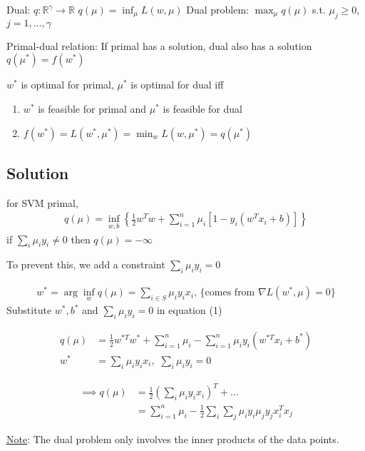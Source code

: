 \documentclass[11pt]{article}
\begin{document}
Dual: \(q: \mathbb{R}^{\gamma} \rightarrow \mathbb{R}\)
\(q(\mu) = \inf_{\mu} L(w, \mu)\)
Dual problem: \(\max_{\mu} q(\mu)\) s.t. \(\mu_j \geq 0\), \(j = 1, ..., \gamma\)

Primal-dual relation: If primal has a solution, dual also has a solution
\(q(\mu^{*}) = f(w^{*})\)

\(w^{*}\) is optimal for primal, \(\mu^{*}\) is optimal for dual iff
\begin{enumerate}
\item \(w^{*}\) is feasible for primal and \(\mu^{*}\) is feasible for dual
\item \(f(w^{*}) = L(w^{*}, \mu^{*}) = \min_w L(w, \mu^{*}) = q(\mu^{*})\)
\end{enumerate}

\subsection{Solution}
\label{sec:orgba442ce}
for SVM primal,
\begin{align}
q(\mu) = \inf_{w, b} \left\{ \frac{1}{2}w^Tw + \sum_{i=1}^n \mu_i \left[ 1 - y_i(w^Tx_i + b) \right] \right\}
\end{align}
if \(\sum_i \mu_iy_i \neq 0\) then \(q(\mu) = -\infty\)

To prevent this, we add a constraint \(\sum_i \mu_iy_i = 0\)

\begin{align*}
w^{*} = \arg\inf_w q(\mu) = \sum_{i \in S} \mu_iy_ix_i \text{, \{comes from } \nabla L(w^{*}, \mu) = 0\}
\end{align*}
Substitute \(w^{*}, b^{*}\) and \(\sum_i \mu_i y_i = 0\) in equation (1)

\begin{align*}
q(\mu) &= \frac{1}{2} w^{*T}w^{*} + \sum_{i=1}^n \mu_i - \sum_{i=1}^n \mu_i y_i (w^{*T}x_i + b^{*}) \\
w^{*} &= \sum_i \mu_iy_ix_i, \,\, \sum_i\mu_iy_i = 0
\end{align*}

\begin{align*}
\implies q(\mu) &= \frac{1}{2} \left( \sum_i \mu_iy_ix_i  \right)^T + \dots \\
                &= \sum_{i=1}^n\mu_i - \frac{1}{2}\sum_i\sum_j \mu_iy_i \mu_jy_j x_i^Tx_j
\end{align*}

\uline{Note}: The dual problem only involves the inner products of the data points.
\end{document}
